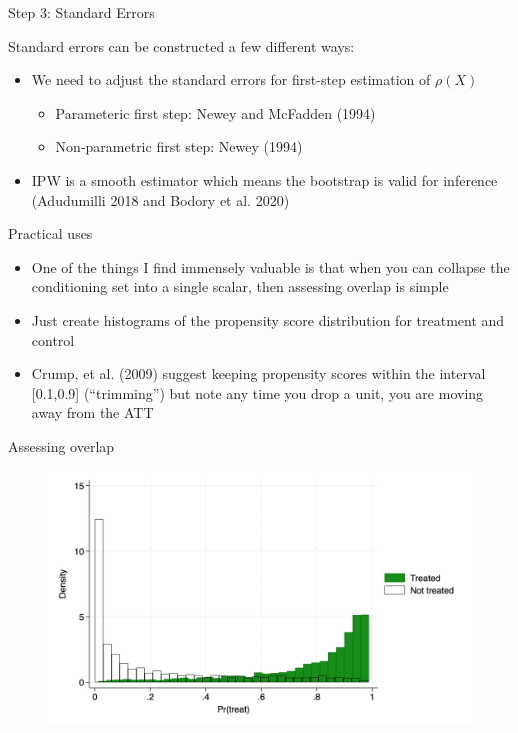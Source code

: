 \documentclass{beamer}
\begin{document}
\begin{frame}{Step 3: Standard Errors}
	
		
Standard errors can be constructed a few different ways:
	\begin{itemize}
	\item We need to adjust the standard errors for first-step estimation of $\rho(X)$
		\begin{itemize}
		\item Parameteric first step: Newey and McFadden (1994)
		\item Non-parametric first step: Newey (1994)
		\end{itemize}
	\item IPW is a smooth estimator which means the bootstrap is valid for inference  (Adudumilli 2018 and Bodory et al. 2020) 
	\end{itemize}
\end{frame}


\begin{frame}{Practical uses}

\begin{itemize}

\item One of the things I find immensely valuable is that when you can collapse the conditioning set into a single scalar, then assessing overlap is simple
\item Just create histograms of the propensity score distribution for treatment and control
\item Crump, et al. (2009) suggest keeping propensity scores within the interval [0.1,0.9] (``trimming'') but note any time you drop a unit, you are moving away from the ATT

\end{itemize}

\end{frame}

\begin{frame}{Assessing overlap}

\begin{figure}[!t]\centering
\includegraphics[scale=0.12]{./lecture_includes/pscore_overlap}
\end{figure}

\end{frame}
\end{document}
